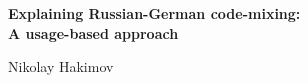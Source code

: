\begin{titlepage}

\vspace*{0cm} %

\begin{center}

\Large

\textbf{\Large Explaining Russian-German code-mixing:\\A usage-based approach }

\vspace{3.5cm}


\vspace{5cm}

Nikolay Hakimov\\

\vspace{1.6cm}


\vspace{1.6cm}

\end{center}
	
\end{titlepage}